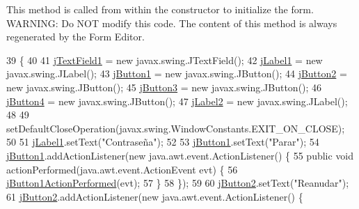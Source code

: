 This method is called from within the constructor to initialize the form. W\+A\+R\+N\+I\+NG\+: Do N\+OT modify this code. The content of this method is always regenerated by the Form Editor. 
\begin{DoxyCode}
39                                   \{
40 
41         \mbox{\hyperlink{classpecl6part2_1_1_modulo_controlador_a7a8c12d92360f65dd601091c44ef20d9}{jTextField1}} = \textcolor{keyword}{new} javax.swing.JTextField();
42         \mbox{\hyperlink{classpecl6part2_1_1_modulo_controlador_a8f34e28c463eece3072679131fe0c448}{jLabel1}} = \textcolor{keyword}{new} javax.swing.JLabel();
43         \mbox{\hyperlink{classpecl6part2_1_1_modulo_controlador_acdf6c079fea2dc2a66c8b0e5f4ec10e3}{jButton1}} = \textcolor{keyword}{new} javax.swing.JButton();
44         \mbox{\hyperlink{classpecl6part2_1_1_modulo_controlador_a38f1d50c40672c81a4ec1fa0a5fa1ca9}{jButton2}} = \textcolor{keyword}{new} javax.swing.JButton();
45         \mbox{\hyperlink{classpecl6part2_1_1_modulo_controlador_a0e4337a4107a44ac33ceb447ee056f59}{jButton3}} = \textcolor{keyword}{new} javax.swing.JButton();
46         \mbox{\hyperlink{classpecl6part2_1_1_modulo_controlador_a0fd427b07850c91ef7c49d42321b6ec4}{jButton4}} = \textcolor{keyword}{new} javax.swing.JButton();
47         \mbox{\hyperlink{classpecl6part2_1_1_modulo_controlador_a322924ffd4409beca92e1f9ef6d108e5}{jLabel2}} = \textcolor{keyword}{new} javax.swing.JLabel();
48 
49         setDefaultCloseOperation(javax.swing.WindowConstants.EXIT\_ON\_CLOSE);
50 
51         \mbox{\hyperlink{classpecl6part2_1_1_modulo_controlador_a8f34e28c463eece3072679131fe0c448}{jLabel1}}.setText(\textcolor{stringliteral}{"Contraseña"});
52 
53         \mbox{\hyperlink{classpecl6part2_1_1_modulo_controlador_acdf6c079fea2dc2a66c8b0e5f4ec10e3}{jButton1}}.setText(\textcolor{stringliteral}{"Parar"});
54         \mbox{\hyperlink{classpecl6part2_1_1_modulo_controlador_acdf6c079fea2dc2a66c8b0e5f4ec10e3}{jButton1}}.addActionListener(\textcolor{keyword}{new} java.awt.event.ActionListener() \{
55             \textcolor{keyword}{public} \textcolor{keywordtype}{void} actionPerformed(java.awt.event.ActionEvent evt) \{
56                 \mbox{\hyperlink{classpecl6part2_1_1_modulo_controlador_a5d79b80be4cc9669c8ce67196182e943}{jButton1ActionPerformed}}(evt);
57             \}
58         \});
59 
60         \mbox{\hyperlink{classpecl6part2_1_1_modulo_controlador_a38f1d50c40672c81a4ec1fa0a5fa1ca9}{jButton2}}.setText(\textcolor{stringliteral}{"Reanudar"});
61         \mbox{\hyperlink{classpecl6part2_1_1_modulo_controlador_a38f1d50c40672c81a4ec1fa0a5fa1ca9}{jButton2}}.addActionListener(\textcolor{keyword}{new} java.awt.event.ActionListener() \{

\end{DoxyCode}
